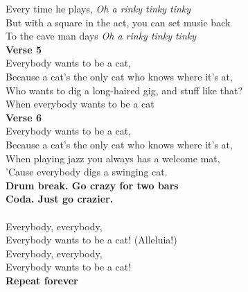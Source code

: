 Every time he plays, \emph{Oh a rinky tinky tinky}\\
But with a square in the act, you can set music back\\
To the cave man days \emph{Oh a rinky tinky tinky}\\
\textbf{Verse 5}\\
Everybody wants to be a cat,\\
Because a cat's the only cat who knows where it's at,\\
Who wants to dig a long-haired gig, and stuff like that?\\
When everybody wants to be a cat\\
\textbf{Verse 6}\\
Everybody wants to be a cat,\\
Because a cat's the only cat who knows where it's at,\\
When playing jazz you always has a welcome mat,\\
'Cause everybody digs a swinging cat.\\
\textbf{Drum break. Go crazy for two bars}\\
\textbf{Coda. Just go crazier.}\\
     \\
Everybody, everybody,\\
 Everybody wants to be a cat! (Alleluia!)\\
Everybody, everybody,\\
 Everybody wants to be a cat!\\
\textbf{Repeat forever}\\

